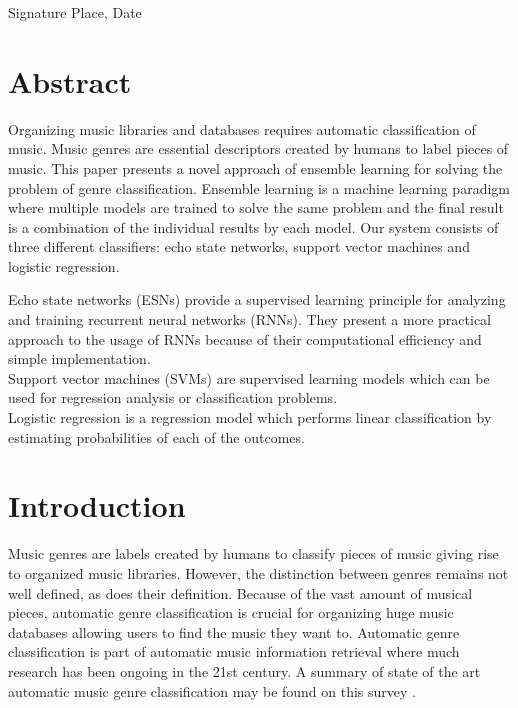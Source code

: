 \documentclass[a4paper,11pt,oneside]{article}
\begin{document}
\vspace{20mm}

Signature \hfill Place, Date

\newpage

\section*{Abstract}

Organizing music libraries and databases requires automatic classification of music.
Music genres are essential descriptors created by humans to label pieces of music.
This paper presents a novel approach of ensemble learning for solving the problem of 
genre classification. Ensemble learning is a machine learning paradigm where multiple 
models are trained to solve the same problem and the final result is a combination 
of the individual results by each model. Our system consists of three different classifiers:
echo state networks, support vector machines and logistic regression.

Echo state networks (ESNs) provide a supervised learning principle for analyzing and training
recurrent neural networks (RNNs). They present a more practical approach to the usage of RNNs 
because of their computational efficiency and simple implementation.\\
Support vector machines (SVMs) are supervised learning models which can be used for regression
analysis or classification problems.\\
Logistic regression is a regression model which performs linear classification by estimating 
probabilities of each of the outcomes.


\newpage
\tableofcontents

\clearpage
{}

\section{Introduction}
Music genres are labels created by humans to classify pieces of music giving rise to organized music libraries. 
However, the distinction between genres remains not well defined, as does their definition. 
Because of the vast amount of musical pieces, automatic genre classification is crucial for
organizing huge music databases allowing users to find the music they want to. 
Automatic genre classification is part of automatic music information retrieval where much research 
has been ongoing in the 21st century. A summary of state of the art automatic music genre 
classification may be found on this survey \cite{survey1}.
\end{document}
